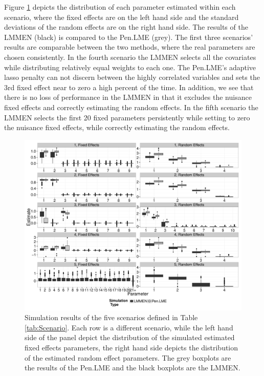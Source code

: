 \documentclass{article}
\begin{document}
Figure \ref{fig:glmmensim} depicts the distribution of each parameter estimated within each scenario, where the fixed effects are on the left hand side and the standard deviations of the random effects are on the right hand side. The results of the LMMEN (black) is compared to the Pen.LME (grey). The first three scenarios' results are comparable between the two methods, where the real parameters are chosen consistently. In the fourth scenario the LMMEN selects all the covariates while distributing relatively equal weights to each one. The Pen.LME's adaptive lasso penalty can not discern between the highly correlated variables and sets the 3rd fixed effect near to zero a high percent of the time. In addition, we see that there is no loss of performance in the LMMEN in that it excludes the nuisance fixed effects and correctly estimating the random effects. In the fifth scenario the LMMEN selects the first 20 fixed parameters persistently while setting to zero the nuisance fixed effects, while correctly estimating the random effects.
%
\begin{figure}[t]
\centering
\includegraphics{figs/lmmen_paper-scenario}
\caption{Simulation results of the five scenarios defined in Table \ref{tab:Scenario}. Each row is a different scenario, while the left hand side of the panel depict the distribution of the simulated estimated fixed effects parameters, the right hand side depicts the distribution of the estimated random effect parameters. The grey boxplots are the results of the Pen.LME and the black boxplots are the LMMEN.}
\label{fig:glmmensim}
\end{figure}
%
\end{document}
